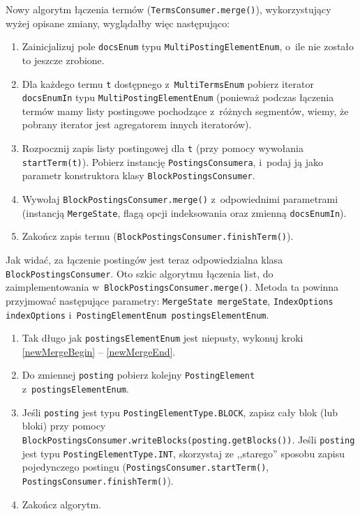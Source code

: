 Nowy algorytm łączenia termów (\texttt{TermsConsumer.merge()}), wykorzystujący wyżej opisane zmiany, wyglądałby więc następująco:
\begin{enumerate}
 \item Zainicjalizuj pole \texttt{docsEnum} typu \texttt{MultiPostingElementEnum}, o~ile nie zostało to jeszcze zrobione.
 \item Dla każdego termu \texttt{t} dostępnego z~\texttt{MultiTermsEnum} pobierz iterator \texttt{docsEnumIn} typu \texttt{MultiPostingElementEnum} (ponieważ podczas łączenia termów mamy listy postingowe pochodzące z~różnych segmentów, wiemy, że pobrany iterator jest agregatorem innych iteratorów).
 \item Rozpocznij zapis listy postingowej dla \texttt{t} (przy pomocy wywołania \texttt{startTerm(t)}). Pobierz instancję \texttt{PostingsConsumera}, i~podaj ją jako parametr konstruktora klasy \texttt{BlockPostingsConsumer}.
 \item Wywołaj \texttt{BlockPostingsConsumer.merge()} z~odpowiednimi parametrami (instancją \texttt{MergeState}, flagą opcji indeksowania oraz zmienną \texttt{docsEnumIn}).
 \item Zakończ zapis termu (\texttt{BlockPostingsConsumer.finishTerm()}).
\end{enumerate}

Jak widać, za łączenie postingów jest teraz odpowiedzialna klasa \texttt{BlockPostingsConsumer}. Oto szkic algorytmu łączenia list, do zaimplementowania w~\texttt{BlockPostingsConsumer.merge()}. Metoda ta powinna przyjmować następujące parametry: \texttt{MergeState mergeState}, \texttt{IndexOptions indexOptions} i~\texttt{PostingElementEnum postingsElementEnum}.
\begin{enumerate}
 \item Tak długo jak \texttt{postingsElementEnum} jest niepusty, wykonuj kroki \ref{newMergeBegin} -- \ref{newMergeEnd}.
 \item \label{newMergeBegin} Do zmiennej \texttt{posting} pobierz kolejny \texttt{PostingElement} z~\texttt{postingsElementEnum}.
 \item \label{newMergeEnd} Jeśli \texttt{posting} jest typu \texttt{PostingElementType.BLOCK}, zapisz cały blok (lub bloki) przy pomocy \texttt{BlockPostingsConsumer.writeBlocks(posting.getBlocks())}. Jeśli \texttt{posting} jest typu \texttt{PostingElementType.INT}, skorzystaj ze ,,starego'' sposobu zapisu pojedynczego postingu (\texttt{PostingsConsumer.startTerm()}, \texttt{PostingsConsumer.finishTerm()}).
 \item Zakończ algorytm.
\end{enumerate}

